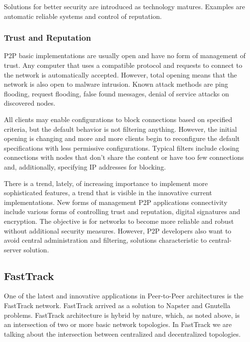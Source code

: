 Solutions for better security are introduced as technology matures. Examples
are automatic reliable systems and control of reputation.

\subsubsection{Trust and Reputation}

P2P basic implementations are usually open and have no form of management of
trust. Any computer that uses a compatible protocol and requests to connect to
the network is automatically accepted. However, total opening means that the
network is also open to malware intrusion. Known attack methods are ping
flooding, request flooding, false found messages, denial of service attacks on
discovered nodes.

All clients may enable configurations to block connections based on specified
criteria, but the default behavior is not filtering anything. However, the
initial opening is changing and more and more clients begin to reconfigure the
default specifications with less permissive configurations. Typical filters
include closing connections with nodes that don't share the content or have
too few connections and, additionally, specifying IP addresses for blocking.

There is a trend, lately, of increasing importance to implement more
sophisticated features, a trend that is visible in the innovative current
implementations. New forms of management P2P applications connectivity include
various forms of controlling trust and reputation, digital signatures and
encryption. The objective is for networks to become more reliable and robust
without additional security measures. However, P2P developers also want to
avoid central administration and filtering, solutions characteristic to
central-server solution.

\subsection{FastTrack}

One of the latest and innovative  applications in Peer-to-Peer architectures
is the FastTrack network. FastTrack arrived as a solution to Napster and
Gnutella problems. FastTrack architecture is hybrid by nature, which, as noted
above, is an intersection of two or more basic network topologies. In
FastTrack we are talking about the intersection between centralized and
decentralized topologies.

